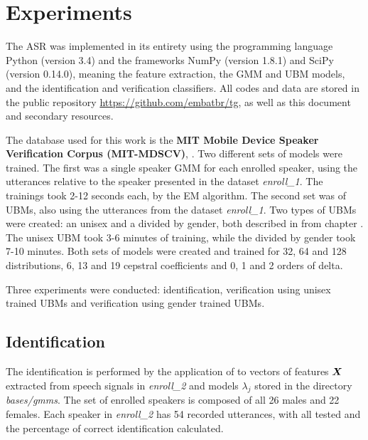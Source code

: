 \chapter{Experiments}
\label{ch:experiments}

The ASR was implemented in its entirety using the programming language Python (version 3.4) and the frameworks NumPy (version 1.8.1) and SciPy (version 0.14.0), meaning the feature extraction, the GMM and UBM models, and the identification and verification classifiers. All codes and data are stored in the public repository \url{https://github.com/embatbr/tg}, as well as this document and secondary resources.

The database used for this work is the \textbf{MIT Mobile Device Speaker Verification Corpus (MIT-MDSCV)}, . Two different sets of models were trained. The first was a single speaker GMM for each enrolled speaker, using the utterances relative to the speaker presented in the dataset \textit{enroll\_1}. The trainings took 2-12 seconds each, by the EM algorithm. The second set was of UBMs, also using the utterances from the dataset \textit{enroll\_1}. Two types of UBMs were created: an unisex and a divided by gender, both described in  from chapter . The unisex UBM took 3-6 minutes of training, while the divided by gender took 7-10 minutes. Both sets of models were created and trained for 32, 64 and 128 distributions, 6, 13 and 19 cepstral coefficients and 0, 1 and 2 orders of delta.

Three experiments were conducted: identification, verification using unisex trained UBMs and verification using gender trained UBMs.

\section{Identification}

The identification is performed by the application of  to vectors of features $\boldsymbol{X}$ extracted from speech signals in \textit{enroll\_2} and models $\lambda_j$ stored in the directory \textit{bases/gmms}. The set of enrolled speakers is composed of all 26 males and 22 females. Each speaker in \textit{enroll\_2} has 54 recorded utterances, with all tested and the percentage of correct identification calculated.

